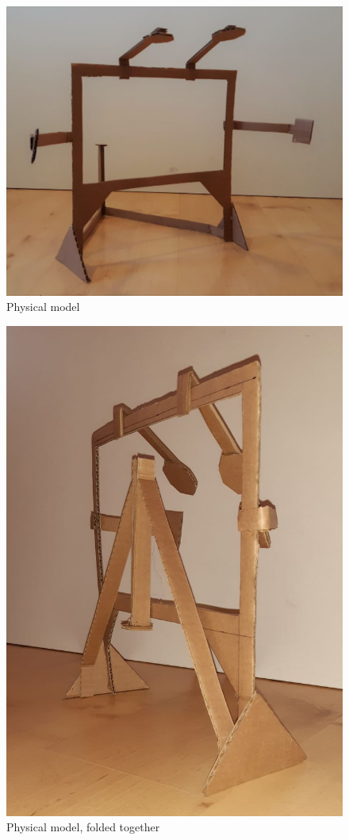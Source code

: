 \documentclass[a4paper]{jpconf}
\begin{document}
\begin{figure}
	\centering 
	\includegraphics[width=1\linewidth]{pappi_1.jpg}
	\caption{Physical model}
	\label{fig:pappi_1}
\end{figure}
\begin{figure}
	\centering
	\includegraphics[width=1\linewidth]{pappi_3.jpg}
	\caption{Physical model, folded together}
	\label{fig:pappi_3}
\end{figure}
\end{document}
